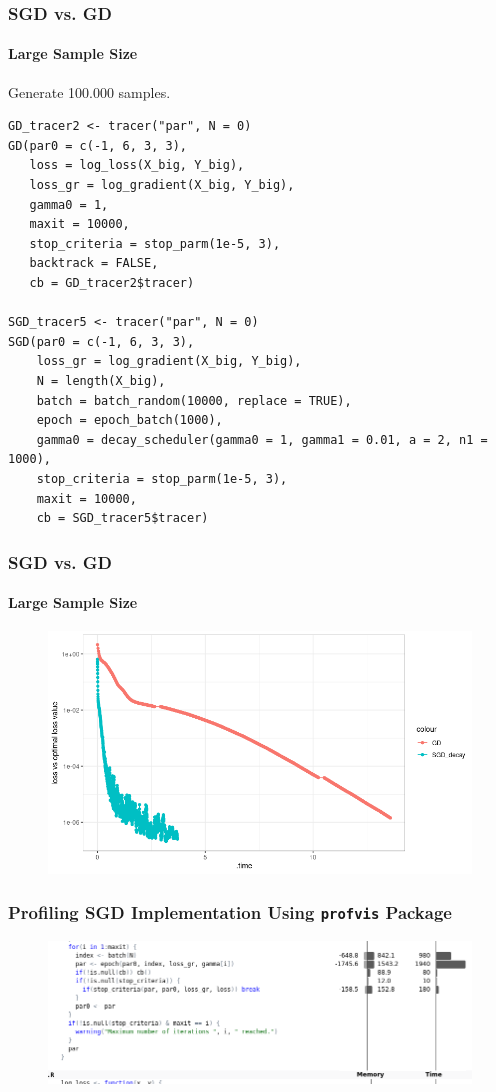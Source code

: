 \documentclass[aspectratio=169]{beamer}
\begin{document}
\begin{frame}[fragile]
    \frametitle{SGD vs. GD}
    \framesubtitle{Large Sample Size}
    Generate 100.000 samples.
\begin{verbatim}
GD_tracer2 <- tracer("par", N = 0)
GD(par0 = c(-1, 6, 3, 3),
   loss = log_loss(X_big, Y_big),
   loss_gr = log_gradient(X_big, Y_big),
   gamma0 = 1,
   maxit = 10000,
   stop_criteria = stop_parm(1e-5, 3),
   backtrack = FALSE,
   cb = GD_tracer2$tracer)

SGD_tracer5 <- tracer("par", N = 0)
SGD(par0 = c(-1, 6, 3, 3),
    loss_gr = log_gradient(X_big, Y_big),
    N = length(X_big),
    batch = batch_random(10000, replace = TRUE),
    epoch = epoch_batch(1000),
    gamma0 = decay_scheduler(gamma0 = 1, gamma1 = 0.01, a = 2, n1 = 1000),
    stop_criteria = stop_parm(1e-5, 3),
    maxit = 10000,
    cb = SGD_tracer5$tracer)
\end{verbatim}
\end{frame}
\begin{frame}
    \frametitle{SGD vs. GD}
    \framesubtitle{Large Sample Size}
    \begin{figure}
        \centering
        \includegraphics[scale = 0.5]{figure/100kComp.png}
    \end{figure}
\end{frame}
\begin{frame}
    \frametitle{Profiling SGD Implementation Using \texttt{profvis} Package}
    \begin{figure}
        \centering
        \includegraphics[scale = 0.4]{figure/SGDProf.png}
    \end{figure}
\end{frame}
\end{document}
